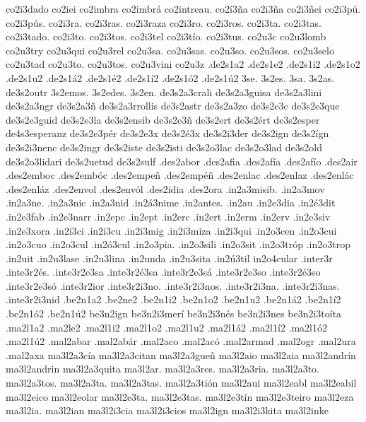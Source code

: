 {co2i3dado 
co2iei 
co2imbra 
co2imbrá 
co2intreau. 
co2í3ña 
co2i3ña 
co2i3ñei 
co2i3pú. 
co2i3pús. 
co2i3ra. 
co2i3ras. 
co2i3raza 
co2i3ro. 
co2i3ros. 
co2i3ta. 
co2i3tas. 
co2i3tado. 
co2i3to. 
co2i3tos. 
co2i3tel 
co2i3tío. 
co2i3tus. 
co2u3c 
co2u3lomb 
co2u3try 
co2u3qui 
co2u3rel 
co2u3sa. 
co2u3sas. 
co2u3so. 
co2u3sos. 
co2u3selo 
co2u3tad 
co2u3to. 
co2u3tos. 
co2u3vini 
co2u3z 
%
.de2s1a2 .de2s1e2 .de2s1i2 .de2s1o2 .de2s1u2 .de2s1á2 .de2s1é2 .de2s1í2 .de2s1ó2 .de2s1ú2 
3se. 3s2es. 3sa. 3s2as. de3s2outr 3s2emos. 3s2edes. 3s2en. 
%
de3s2a3crali 
de3s2a3guisa 
de3s2a3lini 
de3s2a3ngr 
de3s2a3ñ 
de3s2a3rrollis 
de3s2astr 
de3s2a3zo 
de3s2e3c 
de3s2e3que 
de3s2e3guid 
de3s2e3la 
de3s2ensib 
de3s2e3ñ 
de3s2ert 
de3s2ért 
de3s2esper de4s3esperanz 
de3s2e3pér 
de3s2e3x 
de3s2é3x 
de3s2i3der 
de3s2ign 
de3s2ígn 
de3s2i3nenc 
de3s2ingr 
de3s2iste 
de3s2isti 
de3s2o3lac 
de3s2o3lad 
de3s2old 
de3s2o3lidari 
de3s2uetud 
de3s2sulf 
%
.des2abor 
.des2afia 
.des2afía 
.des2afío 
.des2air 
.des2emboc 
.des2embóc 
.des2empeñ 
.des2empéñ 
.des2enlac 
.des2enlaz 
.des2enlác 
.des2enláz 
.des2envol 
.des2envól 
.des2idia 
.des2ora 
%
%
.in2a3misib. 
.in2a3mov 
.in2a3ne. 
.in2a3nic 
.in2a3nid 
.in2á3nime 
.in2antes. 
.in2au 
.in2e3dia 
.in2é3dit 
.in2e3fab 
.in2e3narr 
.in2epc 
.in2ept 
.in2erc 
.in2ert 
.in2erm 
.in2erv 
.in2e3siv 
.in2e3xora 
.in2i3ci 
.in2i3cu 
.in2i3mig 
.in2i3miza 
.in2i3qui 
.in2o3cen 
.in2o3cui 
.in2o3cuo 
.in2o3cul 
.in2ó3cul 
.in2o3pia. 
.in2o3sili 
.in2o3sit 
.in2o3tróp 
.in2o3trop 
.in2uit 
.in2u3lase 
.in2u3lina 
.in2unda 
.in2u3sita 
.in2ú3til 
in2o4cular 
%
.inter3r 
%
.inte3r2és. .inte3r2e3sa .inte3r2é3sa .inte3r2e3sá .inte3r2e3so .inte3r2é3so .inte3r2e3só .inte3r2ior .inte3r2i3no. .inte3r2i3nos. .inte3r2i3na. .inte3r2i3nas. .inte3r2i3nid 
%
.be2n1a2 .be2ne2 .be2n1i2 .be2n1o2 .be2n1u2 .be2n1á2        .be2n1í2 .be2n1ó2 .be2n1ú2 
%
be3n2ign 
be3n2i3merí 
be3n2i3nés 
be3n2i3nes 
be3n2i3toíta 
%
.ma2l1a2 .ma2le2 .ma2l1i2 .ma2l1o2 .ma2l1u2 .ma2l1á2        .ma2l1í2 .ma2l1ó2 .ma2l1ú2 
%
.mal2abar 
.mal2abár 
.mal2aco 
.mal2acó 
.mal2armad 
.mal2ogr 
.mal2ura 
.mal2axa 
%
ma3l2a3cía 
ma3l2a3citan 
ma3l2a3gueñ 
ma3l2aio 
ma3l2aia 
ma3l2andrín 
ma3l2andrin 
ma3l2a3quita 
ma3l2ar. 
ma3l2a3res. 
ma3l2a3ria. 
ma3l2a3to. 
ma3l2a3tos. 
ma3l2a3ta. 
ma3l2a3tas. 
ma3l2a3tión 
ma3l2aui 
ma3l2eabl 
ma3l2eabil 
ma3l2eico 
ma3l2eolar 
ma3l2e3ta. 
ma3l2e3tas. 
ma3l2e3tín 
ma3l2e3teiro 
ma3l2eza 
ma3l2ia. 
ma3l2ian 
ma3l2i3cia 
ma3l2i3cios 
ma3l2ign 
ma3l2i3kita 
ma3l2inke 
}
